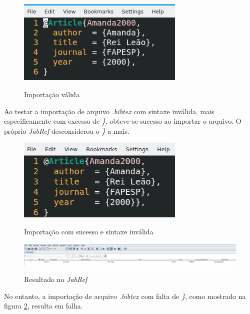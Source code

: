     \begin{figure}[H]
        \caption{Importação válida}
        \vspace{0.5cm}
        \centering
        \includegraphics[width=8cm]{images/exemplo_importacao.png}
        \label{figura:exemplo_importacao}
    \end{figure}

        Ao testar a importação de arquivo \textit{.bibtex} com sintaxe inválida, mais especificamente com excesso de \textit{\}}, obteve-se sucesso ao importar o arquivo. O próprio \textit{JabRef} desconsiderou o \textit{\}} a mais.
    
    \begin{figure}[H]
        \caption{Importação com sucesso e sintaxe inválida}
        \vspace{0.5cm}
        \centering
        \includegraphics[width=8cm]{images/exemplo_importacao_valida.png}
        \label{figura:exemplo_importacao_valida}
    \end{figure}

    \begin{figure}[H]
        \caption{Resultado no \textit{JabRef}}
        \vspace{0.5cm}
        \centering
        \includegraphics[width=15cm]{images/importacao_valida.png}
        \label{figura:importacao_valida}
    \end{figure}

        No entanto, a importação de arquivo \textit{.bibtex} com falta de \textit{\}}, como mostrado na figura \ref{figura:exemplo_importacao_valida}, resulta em falha.

